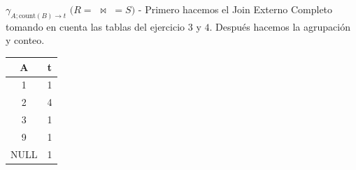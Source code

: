 \item $\gamma_{A; \text{count}(B) \rightarrow t}$ $(R=$ $\mathrel{\!\!\bowtie\!\!}$ $=S)$ - Primero hacemos el Join Externo Completo tomando en cuenta las tablas del ejercicio $3$ y $4$. Después hacemos la agrupación y conteo.

\begin{center}
\begin{tabular}{cc}
\toprule
\textbf{A} & \textbf{t} \\
\midrule
1 & 1 \\
2 & 4 \\
3 & 1 \\
9 & 1 \\
NULL & 1 \\
\bottomrule
\end{tabular}
\end{center}
